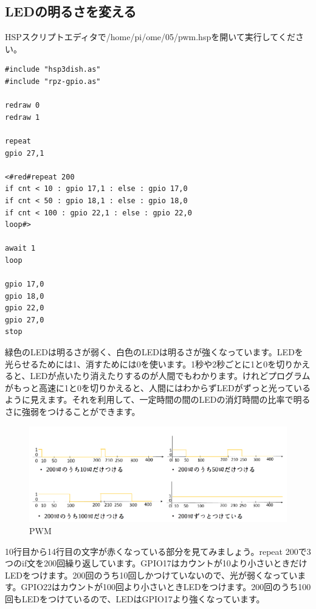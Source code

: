\subsection{LEDの明るさを変える}
HSPスクリプトエディタで/home/pi/ome/05/pwm.hspを開いて実行してください。\\

\begin{lstlisting}[caption=pwm.hsp,label=pwm.hsp]
#include "hsp3dish.as"
#include "rpz-gpio.as"

redraw 0
redraw 1

repeat
gpio 27,1

<#red#repeat 200
if cnt < 10 : gpio 17,1 : else : gpio 17,0
if cnt < 50 : gpio 18,1 : else : gpio 18,0
if cnt < 100 : gpio 22,1 : else : gpio 22,0
loop#>

await 1
loop

gpio 17,0
gpio 18,0
gpio 22,0
gpio 27,0
stop

\end{lstlisting}

緑色のLEDは明るさが弱く、白色のLEDは明るさが強くなっています。LEDを光らせるためには1、消すためには0を使います。1秒や2秒ごとに1と0を切りかえると、LEDが点いたり消えたりするのが人間でもわかります。けれどプログラムがもっと高速に1と0を切りかえると、人間にはわからずLEDがずっと光っているように見えます。それを利用して、一定時間の間のLEDの消灯時間の比率で明るさに強弱をつけることができます。

\begin{figure}[H]
\centering
\includegraphics[scale=0.5]{images/chap05/text05-img035.png}
\caption{PWM}
\end{figure}

10行目から14行目の文字が赤くなっている部分を見てみましょう。repeat 200で3つのif文を200回繰り返しています。GPIO17はカウントが10より小さいときだけLEDをつけます。200回のうち10回しかつけていないので、光が弱くなっています。GPIO22はカウントが100回より小さいときLEDをつけます。200回のうち100回もLEDをつけているので、LEDはGPIO17より強くなっています。
